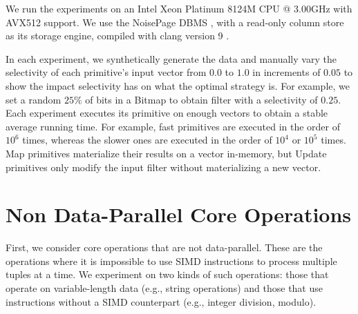 \documentclass[12pt]{cmuthesis}
\begin{document}
We run the experiments on an Intel Xeon Platinum 8124M CPU @ 3.00GHz with AVX512 support. We use the NoisePage DBMS \cite{noise_page}, with a read-only column store as its storage engine, compiled with clang version 9 \cite{clang}.

In each experiment, we synthetically generate the data and manually vary the selectivity of each primitive's input vector from $0.0$ to $1.0$ in increments of $0.05$ to show the impact selectivity has on what the optimal strategy is. For example, we set a random $25\%$ of bits in a Bitmap to obtain filter with a selectivity of $0.25$. Each experiment executes its primitive on enough vectors to obtain a stable average running time. For example, fast primitives are executed in the order of $10^6$ times, whereas the slower ones are executed in the order of $10^4$ or $10^5$ times. Map primitives materialize their results on a vector in-memory, but Update primitives only modify the input filter without materializing a new vector.


\section{Non Data-Parallel Core Operations}
\label{nondataparallel}
First, we consider core operations that are not data-parallel. These are the operations where it is impossible to use SIMD instructions to process multiple tuples at a time. We experiment on two kinds of such operations: those that operate on variable-length data (e.g., string operations) and those that use instructions without a SIMD counterpart (e.g., integer division, modulo).
\end{document}
